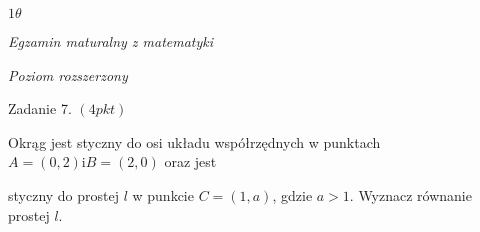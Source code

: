 \documentclass[a4paper,12pt]{article}
\begin{document}
$ 1\theta$

{\it Egzamin maturalny z matematyki}

{\it Poziom rozszerzony}

Zadanie 7. $(4pkt)$

Okrąg jest styczny do osi układu współrzędnych w punktach $A=(0,2) \mathrm{i}B=(2,0)$ oraz jest

styczny do prostej $l$ w punkcie $C=(1,a)$, gdzie $a>1$. Wyznacz równanie prostej $l.$
\end{document}

